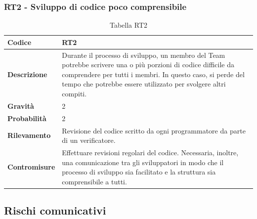 \documentclass{article}
\begin{document}
    \subsubsection{RT2 - Sviluppo di codice poco comprensibile}
    \begin{table}[H]
        \renewcommand{\arraystretch}{1.5}
        \centering
        \begin{tabular}{|p{3cm}|p{11cm}|}
            \hline
            \textbf{Codice} & RT2 \\
            \hline
            \textbf{Descrizione} & Durante il processo di sviluppo, un membro del Team potrebbe scrivere una o più porzioni di codice difficile da comprendere per tutti i membri. In questo caso, si perde del tempo che potrebbe essere utilizzato per svolgere altri compiti. \\
            \hline
            \textbf{Gravità} & 2 \\
            \hline
            \textbf{Probabilità} & 2 \\
            \hline
            \textbf{Rilevamento} & Revisione del codice scritto da ogni programmatore da parte di un verificatore. \\
            \hline
            \textbf{Contromisure} & Effettuare revisioni regolari del codice. Necessaria, inoltre, una comunicazione tra gli sviluppatori in modo che il processo di sviluppo sia facilitato e la struttura sia comprensibile a tutti. \\
            \hline
        \end{tabular}
        \caption{Tabella RT2}
    \end{table}

    
    \subsection{Rischi comunicativi}
            
\end{document}
